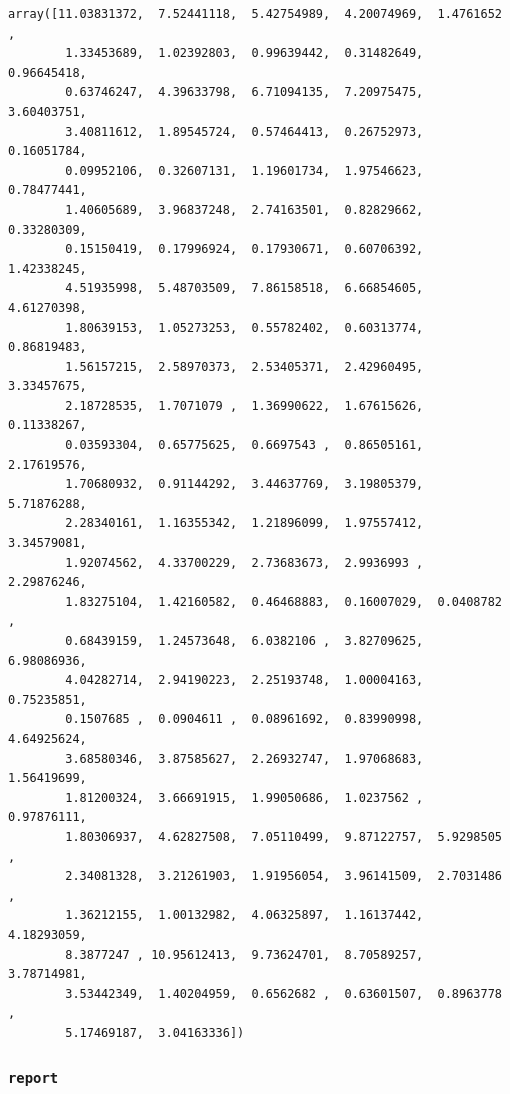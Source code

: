 \documentclass[11pt]{article}
\makeatletter
\newcommand{\boxspacing}{\kern\kvtcb@left@rule\kern\kvtcb@boxsep}
\newcommand{\prompt}[4]{
        \ttfamily\llap{{\color{#2}[#3]:\hspace{3pt}#4}}\vspace{-\baselineskip}
    }
\makeatother
\begin{document}
            \begin{tcolorbox}[breakable, size=fbox, boxrule=.5pt, pad at break*=1mm, opacityfill=0]
\prompt{Out}{outcolor}{0}{\boxspacing}
\begin{Verbatim}[commandchars=\\\{\}]
array([11.03831372,  7.52441118,  5.42754989,  4.20074969,  1.4761652 ,
        1.33453689,  1.02392803,  0.99639442,  0.31482649,  0.96645418,
        0.63746247,  4.39633798,  6.71094135,  7.20975475,  3.60403751,
        3.40811612,  1.89545724,  0.57464413,  0.26752973,  0.16051784,
        0.09952106,  0.32607131,  1.19601734,  1.97546623,  0.78477441,
        1.40605689,  3.96837248,  2.74163501,  0.82829662,  0.33280309,
        0.15150419,  0.17996924,  0.17930671,  0.60706392,  1.42338245,
        4.51935998,  5.48703509,  7.86158518,  6.66854605,  4.61270398,
        1.80639153,  1.05273253,  0.55782402,  0.60313774,  0.86819483,
        1.56157215,  2.58970373,  2.53405371,  2.42960495,  3.33457675,
        2.18728535,  1.7071079 ,  1.36990622,  1.67615626,  0.11338267,
        0.03593304,  0.65775625,  0.6697543 ,  0.86505161,  2.17619576,
        1.70680932,  0.91144292,  3.44637769,  3.19805379,  5.71876288,
        2.28340161,  1.16355342,  1.21896099,  1.97557412,  3.34579081,
        1.92074562,  4.33700229,  2.73683673,  2.9936993 ,  2.29876246,
        1.83275104,  1.42160582,  0.46468883,  0.16007029,  0.0408782 ,
        0.68439159,  1.24573648,  6.0382106 ,  3.82709625,  6.98086936,
        4.04282714,  2.94190223,  2.25193748,  1.00004163,  0.75235851,
        0.1507685 ,  0.0904611 ,  0.08961692,  0.83990998,  4.64925624,
        3.68580346,  3.87585627,  2.26932747,  1.97068683,  1.56419699,
        1.81200324,  3.66691915,  1.99050686,  1.0237562 ,  0.97876111,
        1.80306937,  4.62827508,  7.05110499,  9.87122757,  5.9298505 ,
        2.34081328,  3.21261903,  1.91956054,  3.96141509,  2.7031486 ,
        1.36212155,  1.00132982,  4.06325897,  1.16137442,  4.18293059,
        8.3877247 , 10.95612413,  9.73624701,  8.70589257,  3.78714981,
        3.53442349,  1.40204959,  0.6562682 ,  0.63601507,  0.8963778 ,
        5.17469187,  3.04163336])
\end{Verbatim}
\end{tcolorbox}
        
    \hypertarget{report}{%
\subsubsection{\texorpdfstring{\texttt{report}}{report}}\label{report}}
\end{document}
